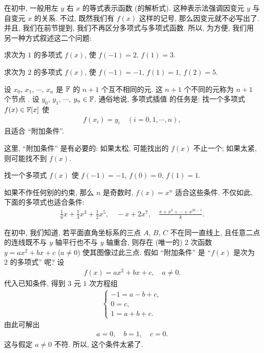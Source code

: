 在初中, 一般用左 $y$ 右 $x$ 的等式表示函数 (的解析式). 这种表示法强调因变元  $y$ 与自变元  $x$ 的关系. 不过, 既然我们有 $f(x)$ 这样的记号, 那么因变元就不必写出了. 并且, 我们在前节提到, 我们不再区分多项式与多项式函数. 所以, 为方便, 我们用另一种方式叙述这二个问题:

\begin{example}
    求次为 $1$ 的多项式 $f(x)$, 使 $f(-1)=2$, $f(1)=3$.
\end{example}

\begin{example}
    求次为 $2$ 的多项式 $f(x)$, 使 $f(-1)=-1$, $f(1)=1$, $f(2)=5$.
\end{example}

设 $x_0$, $x_1$, $\cdots$, $x_{n}$ 是 $\mathbb{F}$ 的 $n+1$ 个互不相同的元. 这 $n+1$ 个不同的元称为 $n+1$ 个节点 . 设 $y_0$, $y_1$, $\cdots$, $y_{n} \in \mathbb{F}$. 通俗地说, 多项式插值  的任务是: 找一个多项式 $f(x) \in \mathbb{F}[x]$ 使
\begin{align*}
    f(x_i) = y_i \quad (i = 0,1,\cdots,n),
\end{align*}
且适合 ``附加条件''.

这里, ``附加条件'' 是有必要的: 如果太松, 可能找出的 $f(x)$ 不止一个; 如果太紧, 则可能找不到 $f(x)$.

\begin{example}
    找一个多项式 $f(x)$ 使 $f(-1)=-1$, $f(0)=0$, $f(1)=1$.

    如果不作任何别的约束, 那么 $n$ 是奇数时, $f(x) = x^n$ 适合这些条件. 不仅如此, 下面的多项式也适合条件:
    \begin{align*}
        \frac{1}{6}x + \frac{1}{3}x^3 + \frac{1}{2}x^5, \quad -x + 2x^7, \quad \frac{x + x^3 + \cdots + x^{2k-1}}{k}.
    \end{align*}

    在初中, 我们知道, 若平面直角坐标系的三点 $A$, $B$, $C$ 不在同一直线上, 且任意二点的连线既不与 $y$ 轴平行也不与 $y$ 轴重合, 则存在 (唯一的) $2$ 次函数 $y = ax^2 + bx + c$ ($a \neq 0$) 使其图像过此三点. 假如 ``附加条件'' 是 ``$f(x)$ 是次为 $2$ 的多项式'' 呢? 设
    \begin{align*}
        f(x) = ax^2 + bx + c, \quad a \neq 0.
    \end{align*}
    代入已知条件, 得到 $3$ 元 $1$ 次方程组
    \begin{align*}
        \begin{cases}
            -1 = a - b + c, \\
            0 = c,          \\
            1 = a + b + c.
        \end{cases}
    \end{align*}
    由此可解出
    \begin{align*}
        a = 0, \quad b = 1, \quad c = 0.
    \end{align*}
    这与假定 $a \neq 0$ 不符. 所以, 这个条件太紧了.
\end{example}

